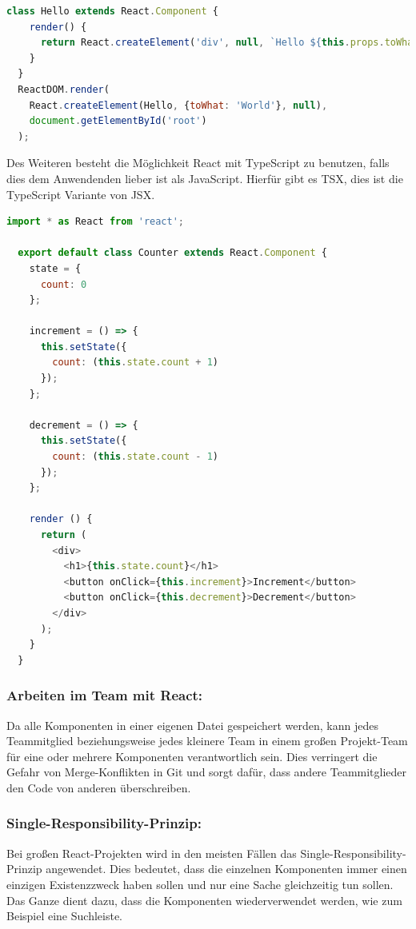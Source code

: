 \begin{lstlisting}[language=JavaScript, caption='Hello World' mit einfachem JavaScript, label=lst:impl:helloWorldJSX]
  class Hello extends React.Component {
    render() {
      return React.createElement('div', null, `Hello ${this.props.toWhat}`);
    }
  }
  ReactDOM.render(
    React.createElement(Hello, {toWhat: 'World'}, null),
    document.getElementById('root')
  );
\end{lstlisting} \cite{ReactWithoutJSX}

Des Weiteren besteht die Möglichkeit React mit TypeScript zu benutzen, falls dies dem Anwendenden lieber ist als JavaScript. Hierfür gibt es TSX, dies ist die TypeScript Variante von JSX. 

\begin{lstlisting}[language=JavaScript, caption=Beispiel-Code eines Click Counters in TSX label=lst:impl:TSXcounter]
  import * as React from 'react';

  export default class Counter extends React.Component {
    state = {
      count: 0
    };

    increment = () => {
      this.setState({
        count: (this.state.count + 1)
      });
    };

    decrement = () => {
      this.setState({
        count: (this.state.count - 1)
      });
    };

    render () {
      return (
        <div>
          <h1>{this.state.count}</h1>
          <button onClick={this.increment}>Increment</button>
          <button onClick={this.decrement}>Decrement</button>
        </div>
      );
    }
  }
\end{lstlisting} \cite{ReactWithoutJSX2}

\subsubsection{Arbeiten im Team mit React:}
Da alle Komponenten in einer eigenen Datei gespeichert werden, kann jedes Teammitglied beziehungsweise jedes kleinere Team in einem großen Projekt-Team für eine oder mehrere Komponenten verantwortlich sein. Dies verringert die Gefahr von Merge-Konflikten in Git und sorgt dafür, dass andere Teammitglieder den Code von anderen überschreiben.
\cite{PropsAndComponents2}

\subsubsection{Single-Responsibility-Prinzip:}
Bei großen React-Projekten wird in den meisten Fällen das Single-Responsibility-Prinzip angewendet. Dies bedeutet, dass die einzelnen Komponenten immer einen einzigen Existenzzweck haben sollen und nur eine Sache gleichzeitig tun sollen. Das Ganze dient dazu, dass die Komponenten wiederverwendet werden, wie zum Beispiel eine Suchleiste.
\cite{SRP}

